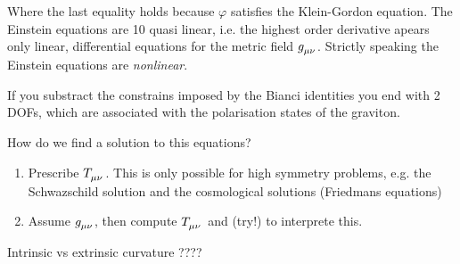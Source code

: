 Where the last equality holds because $\varphi$ satisfies the Klein-Gordon
equation. The Einstein equations are 10 quasi linear, i.e. the highest order
derivative apears only linear, differential equations for the metric field
$\tensor{g}{_\mu_\nu}$. Strictly speaking the Einstein equations are
\emph{nonlinear}.
\begin{sidenote}
If you substract the constrains imposed by the Bianci identities you end with 2
DOFs, which are associated with the polarisation states of the graviton.
\end{sidenote}
How do we find a solution to this equations?
\begin{enumerate}
  \item Prescribe $\tensor{T}{_\mu_\nu}$. This is only possible for high
  symmetry problems, e.g. the Schwazschild solution and the cosmological
  solutions (Friedmans equations)
  \item Assume $\tensor{g}{_\mu_\nu}$, then compute $\tensor{T}{_\mu_\nu}$ and
  (try!) to interprete this.
\end{enumerate}
Intrinsic vs extrinsic curvature ????
